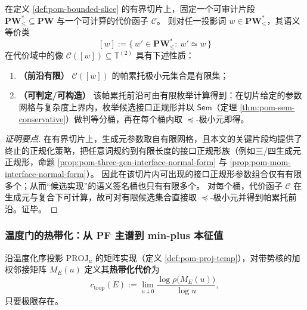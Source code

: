 \begin{proposition}\label{prop:pom-cost-optimization-decidable}
在定义 \ref{def:pom-bounded-slice} 的有界切片上，固定一个可审计片段 \(\mathbf{PW}^{\ast}_{\le}\subseteq\mathbf{PW}\) 与一个可计算的代价函子 \(\mathcal{C}\)。
则对任一投影词 \(w\in\mathbf{PW}^{\ast}_{\le}\)，其语义等价类
\[
[w]:=\{\,w'\in\mathbf{PW}^{\ast}_{\le}:\ w'\simeq w\,\}
\]
在代价域中的像
\(
\mathcal{C}([w])\subseteq \mathbb{T}^{(2)}
\)
具有下述性质：
\begin{enumerate}
  \item \textbf{（前沿有限）} \(\mathcal{C}([w])\) 的帕累托极小元集合是有限集；
  \item \textbf{（可判定/可构造）} 该帕累托前沿可由有限枚举计算得到：在切片给定的参数网格与复杂度上界内，枚举候选接口正规形并以 \(\mathsf{Sem}\)（定理 \ref{thm:pom-sem-conservative}）做判等分桶，再在每个桶内取 \(\preceq\)-极小元即得。
\end{enumerate}
\end{proposition}
\begin{proof}[证明要点]
在有界切片上，生成元参数取自有限网格，且本文的关键片段均提供了终止的正规化策略，把任意词规约到有限长度的接口正规形族（例如三/四生成元正规形，命题 \ref{prop:pom-three-gen-interface-normal-form} 与 \ref{prop:pom-mom-interface-normal-form}）。
因此在该切片内可出现的接口正规形参数组合仅有有限多个；从而“候选实现”的语义签名桶也只有有限多个。
对每个桶，代价函子 \(\mathcal{C}\) 在生成元与复合下可计算，故可对有限候选集合直接取 \(\preceq\)-极小元并得到帕累托前沿。证毕。
\end{proof}

\subsubsection{温度门的热带化：从 PF 主谱到 min-plus 本征值}\label{subsec:pom-proj-tropicalization}
\begin{definition}[温度门的热带化代价]\label{def:pom-proj-tropical-cost}
沿温度化序投影 \(\mathrm{PROJ}_u\) 的矩阵实现（定义 \ref{def:pom-proj-temp}），对带势核的加权邻接矩阵 \(M_E(u)\) 定义其\textbf{热带化代价}为
$$
c_{\mathrm{trop}}(E)
:=\lim_{u\downarrow 0}\frac{\log \rho\!\bigl(M_E(u)\bigr)}{\log u},
$$
只要极限存在。
\end{definition}

